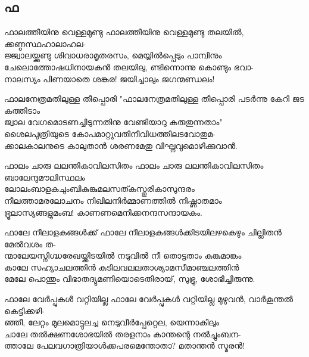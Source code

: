 \subsection{ഫ}
\begin{enumerate}

\begin{slokam}{\VSv}{\Unk}{ഫാലത്തീയിനു വെള്ളമുണ്ടു}
ഫാലത്തീയിനു വെള്ളമുണ്ടു തലയിൽ, ക്കണ്ഠസ്ഥഹാലാഹല-\\
ജ്ജ്വാലയ്ക്കുണ്ടു ശിവാധരാമൃതരസം, മെയ്യിൽപ്പെടും പാമ്പിനും\\
ചേലൊത്തോഷധിനായകൻ തലയിലു, ണ്ടിന്നൊന്നു കൊണ്ടും ഭവാ-\\
നാലസ്യം പിണയാതെ ശങ്കര! ജയിച്ചാലും ജഗന്മണ്ഡലം!
\end{slokam}



\begin{slokam}{\VKm}{\Balendu}{ഫാലനേത്രമതിലുള്ള തീപ്പൊരി}
"ഫാലനേത്രമതിലുള്ള തീപ്പൊരി പടര്‍ന്നു കേറി ജട കത്തിടാം\\
ജ്വാല വേഗമൊടണച്ചിടുന്നതിനു വേണ്ടിയാറു കരുതുന്നതാം"\\
ശൈലപുത്രിയുടെ കോപമാറ്റുവതിനീവിധത്തിലടവോതുമ-\\
ക്കാലകാലനുടെ കാലുതാന്‍ ശരണമേതു വിഘ്നവുമൊഴിക്കുവാന്‍.
\end{slokam}



\begin{slokam}{\VSv}{\KKK}{ഫാലം ചാരു ലലന്തികാവിലസിതം}
 ഫാലം ചാരു ലലന്തികാവിലസിതം ബാലേന്ദുമൗലിസ്ഥലം\\
ലോലംബാളകചുംബികുങ്കുമലസത്കസ്തൂരികാസുന്ദരം\\
നീലത്താമരലോചനം നിഖിലനിർമ്മാണത്തിൽ നിഷ്ണാതമാം\\
ഭ്രൂലാസ്യങ്ങളുമംബ! കാണണമെനിക്കനന്ദസന്ദായകം.
\end{slokam}


\begin{slokam}{\VSr}{\KND}{ഫാലേ നീലാളകങ്ങൾക്ക്}
ഫാലേ നീലാളകങ്ങള്‍ക്കിടയിലഴകെഴും ചില്ലിതൻ മേൽവശം ത-\\
ന്മാലേയസ്നിഗ്ദ്ധരേഖയ്ക്കിടയിൽ നടുവിൽ നീ തൊട്ടതാം കുങ്കുമാങ്കം\\
കാലേ സഹ്യാചലത്തിൻ കുടിലവലലതാശ്യാമസീമാഞ്ചലത്തിൻ\\
മേലേ പൊന്തും വിഭാതദ്യുമണിയൊടെതിരായ്‌, സുഭ്രു, ശോഭിച്ചിരുന്നു.
\end{slokam}


\begin{slokam}{\VSv}{\VNM}{ഫാലേ വേർപ്പുകള്‍ വറ്റിയില്ല}
 ഫാലേ വേർപ്പുകള്‍ വറ്റിയില്ല മുഴുവൻ, വാർകൂന്തൽ കെട്ടിക്കഴി-\\
ഞ്ഞീ, ലേറ്റം മുലമൊട്ടുലച്ച നെടുവീർപ്പേറ്റെല, യെന്നാകിലും\\
ചാലേ തൽക്ഷണശോഭയിൽ തരളനാം കാന്തന്റെ നൽച്ചുംബന-\\
ത്താലേ പേലവഗാത്രിയാള്‍ക്കപരമെന്തോതാ? മതാന്തൻ സ്മരൻ!
\end{slokam}


\end{enumerate}
